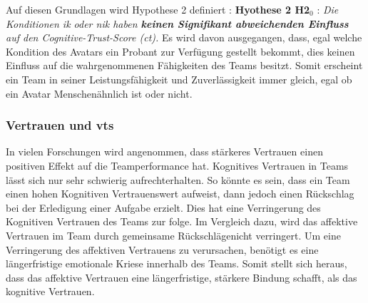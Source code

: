 \documentclass[a4paper,11pt]{article}%
\renewcommand{\\}{\vspace*{0.5\baselineskip} \newline}
\begin{document}
Auf diesen Grundlagen wird Hypothese 2 definiert :
\\
\textbf{Hyothese 2 H2$_{0}$} : \textit{Die Konditionen \ac{ik} oder \ac{nik} haben \textbf{keinen Signifikant abweichenden Einfluss} auf den Cognitive-Trust-Score (\ac{ct}).} \\
Es wird davon ausgegangen, dass, egal welche Kondition des Avatars ein Probant zur Verfügung gestellt bekommt, dies keinen Einfluss auf die wahrgenommenen Fähigkeiten des Teams besitzt. Somit erscheint ein Team in seiner Leistungsfähigkeit und Zuverlässigkeit immer gleich, egal ob ein Avatar Menschenähnlich ist oder nicht.




	\subsubsection{Vertrauen und \ac{vts}}
In vielen Forschungen wird angenommen, dass stärkeres Vertrauen einen positiven Effekt auf die Teamperformance hat. \citep{mcallister1995affect} \citep{mayer1995integrative} \citep{dirks2002trust}
Kognitives Vertrauen in Teams lässt sich nur sehr schwierig aufrechterhalten. So könnte es sein, dass ein Team einen hohen Kognitiven Vertrauenswert aufweist, dann jedoch einen Rückschlag bei der Erledigung einer Aufgabe erzielt. Dies hat eine Verringerung des Kognitiven Vertrauen des Teams zur folge. \citep[p.29-31]{mcallister1995affect}
Im Vergleich dazu, wird das affektive Vertrauen im Team durch gemeinsame Rückschlägenicht verringert. Um eine Verringerung des affektiven Vertrauens zu verursachen, benötigt es eine längerfristige emotionale Kriese innerhalb des Teams. Somit stellt sich heraus, dass das affektive Vertrauen eine längerfristige, stärkere Bindung schafft, als das kognitive Vertrauen.  \citep[p.29-31]{mcallister1995affect} \\
\end{document}
